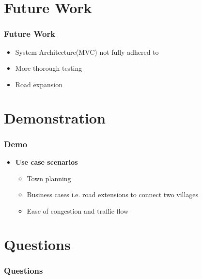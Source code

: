 \documentclass{beamer}
\begin{document}
\section{Future Work}

\begin{frame}
\frametitle{Future Work}
	
\begin{itemize}
	\item System Architecture(MVC) not fully adhered to
	\item More thorough testing 
	\item Road expansion  
\end{itemize}

\end{frame}


\section{Demonstration}

\begin{frame}
\frametitle{Demo}

\begin{itemize}
\item \textbf{Use case scenarios}
	\begin{itemize}
		\item Town planning
		\item Business cases i.e. road extensions to connect two villages
		\item Ease of congestion and traffic flow
	\end{itemize}
\end{itemize}

\end{frame}

\section{Questions}

\begin{frame}
\frametitle{Questions}

\end{frame}
\end{document}
